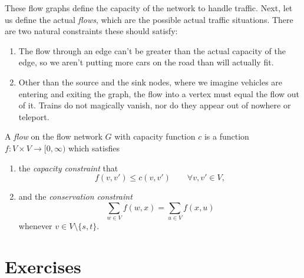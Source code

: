 \documentclass[nobib]{tufte-handout}
\begin{document}
  These flow graphs define the capacity of the network to handle traffic. Next, let us define the actual \emph{flows}, which are the possible actual traffic situations. There are two natural constraints these should satisfy:
  \begin{enumerate}
    \item The flow through an edge can't be greater than the actual capacity of the edge, so we aren't putting more cars on the road than will actually fit.
    \item Other than the source and the sink nodes, where we imagine vehicles are entering and exiting the graph, the flow into a vertex must equal the flow out of it. Trains do not magically vanish, nor do they appear out of nowhere or teleport.
  \end{enumerate}

  \begin{definition}
    A \emph{flow} on the flow network $G$ with capacity function $c$ is a function $f: V \times V \to [0,\infty)$ which satisfies
    \begin{enumerate}
        \item the \emph{capacity constraint} that
        $$f(v, v') \leq c(v, v')\qquad \forall v, v' \in V,$$
        \item and the \emph{conservation constraint}
        $$\sum_{w \in V} f(w, x) = \sum_{u \in V} f(x, u)$$
        whenever $v \in V \setminus \{s,t\}$.
    \end{enumerate}
  \end{definition}




\section{Exercises}

%
%
\end{document}
